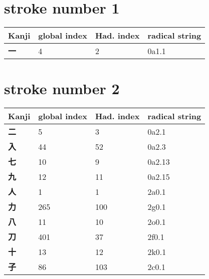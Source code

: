 \section{stroke number 1}
  \begin{longtable}[c]{llll}
    \bfseries Kanji & \bfseries global index & \bfseries Had. index & \bfseries radical string\\\hline\endhead
    \bfseries 一 & 4 & 2 & 0a1.1\\
  \end{longtable}
\section{stroke number 2}
  \begin{longtable}[c]{llll}
    \bfseries Kanji & \bfseries global index & \bfseries Had. index & \bfseries radical string\\\hline\endhead
    \bfseries 二 & 5 & 3 & 0a2.1\\
    \bfseries 入 & 44 & 52 & 0a2.3\\
    \bfseries 七 & 10 & 9 & 0a2.13\\
    \bfseries 九 & 12 & 11 & 0a2.15\\
    \bfseries 人 & 1 & 1 & 2a0.1\\
    \bfseries 力 & 265 & 100 & 2g0.1\\
    \bfseries 八 & 11 & 10 & 2o0.1\\
    \bfseries 刀 & 401 & 37 & 2f0.1\\
    \bfseries 十 & 13 & 12 & 2k0.1\\
    \bfseries 子 & 86 & 103 & 2c0.1\\
  \end{longtable}
